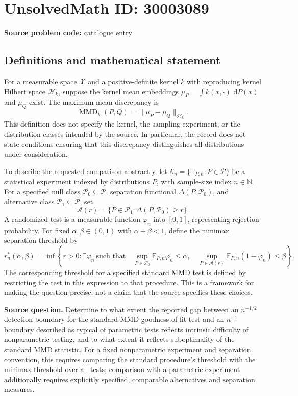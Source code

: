 \documentclass[11pt]{article}
\newcommand{\N}{\mathbb{N}}
\newcommand{\dd}{\,\mathrm{d}}
\begin{document}
\section*{UnsolvedMath ID: 30003089}
\textbf{Source problem code:} catalogue entry
\subsection{Definitions and mathematical statement}
For a measurable space \(\mathcal X\) and a positive-definite kernel \(k\) with reproducing kernel Hilbert space \(\mathcal H_k\), suppose the kernel mean embeddings \(\mu_P=\int k(x,\cdot)\,\dd P(x)\) and \(\mu_Q\) exist. The maximum mean discrepancy is
\[
\operatorname{MMD}_k(P,Q)=\|\mu_P-\mu_Q\|_{\mathcal H_k}.
\]
This definition does not specify the kernel, the sampling experiment, or the distribution classes intended by the source. In particular, the record does not state conditions ensuring that this discrepancy distinguishes all distributions under consideration.

To describe the requested comparison abstractly, let \(\mathcal E_n=\{\mathbb P_{P,n}:P\in\mathcal P\}\) be a statistical experiment indexed by distributions \(P\), with sample-size index \(n\in\N\). For a specified null class \(\mathcal P_0\subseteq\mathcal P\), separation functional \(\Delta(P,\mathcal P_0)\), and alternative class \(\mathcal P_1\subseteq\mathcal P\), set
\[
\mathcal A(r)=\{P\in\mathcal P_1:\Delta(P,\mathcal P_0)\ge r\}.
\]
A randomized test is a measurable function \(\varphi_n\) into \([0,1]\), representing rejection probability. For fixed \(\alpha,\beta\in(0,1)\) with \(\alpha+\beta<1\), define the minimax separation threshold by
\[
r_n^*(\alpha,\beta)=\inf\left\{r>0:\exists\varphi_n\ \text{such that}\quad
\sup_{P\in\mathcal P_0}\mathbb E_{P,n}\varphi_n\le\alpha,
\quad
\sup_{P\in\mathcal A(r)}\mathbb E_{P,n}(1-\varphi_n)\le\beta
\right\}.
\]
The corresponding threshold for a specified standard MMD test is defined by restricting the test in this expression to that procedure. This is a framework for making the question precise, not a claim that the source specifies these choices.

\textbf{Source question.} Determine to what extent the reported gap between an \(n^{-1/2}\) detection boundary for the standard MMD goodness-of-fit test and an \(n^{-1}\) boundary described as typical of parametric tests reflects intrinsic difficulty of nonparametric testing, and to what extent it reflects suboptimality of the standard MMD statistic. For a fixed nonparametric experiment and separation convention, this requires comparing the standard procedure's threshold with the minimax threshold over all tests; comparison with a parametric experiment additionally requires explicitly specified, comparable alternatives and separation measures.
\end{document}
